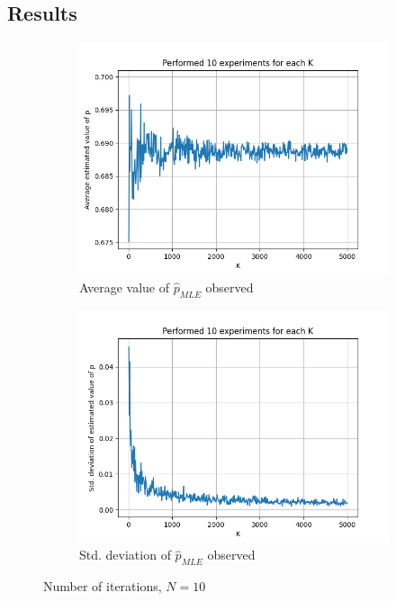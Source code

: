 \documentclass[fleqn, 11pt]{article}
\begin{document}
\subsection{Results}
\begin{figure}[H]
    \centering
    \begin{subfigure}[H]{0.49\textwidth}
        \centering
        \includegraphics[width=\textwidth]{P2/avgs_10.png}
        \caption[]{Average value of $\hat{p}_{MLE}$ observed}
    \end{subfigure}
    \begin{subfigure}[H]{0.49\textwidth}
        \centering
        \includegraphics[width=\textwidth]{P2/stds_10.png}
        \caption[]{Std. deviation of $\hat{p}_{MLE}$ observed}
    \end{subfigure}
    \caption{Number of iterations, $N = 10$}
\end{figure}
\end{document}
